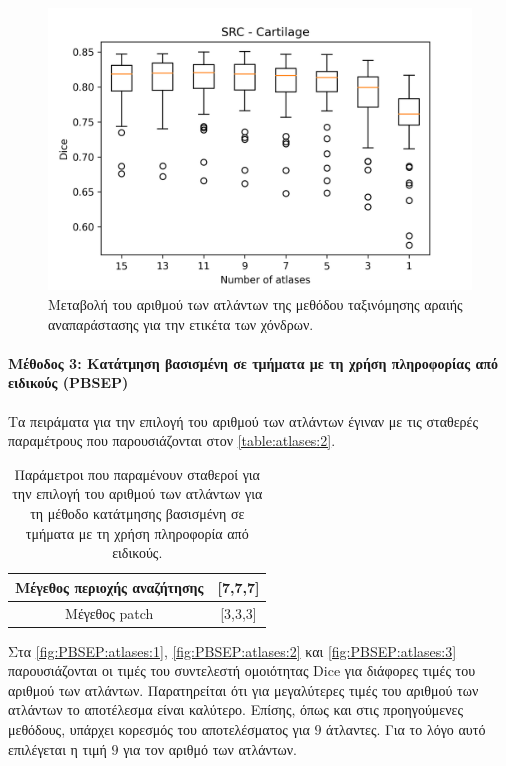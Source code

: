 \documentclass[a4paper,12pt]{article}
\newcommand{\paragraphLine}[1]{\paragraph{#1}\mbox{}}
\begin{document}
\begin{figure}[H]
    \centering
    \includegraphics[width=0.85\linewidth]{SRC_Number_of_atlases_Cartilage_plot.png}
    \caption{Μεταβολή του αριθμού των ατλάντων της μεθόδου ταξινόμησης αραιής
             αναπαράστασης για την ετικέτα των χόνδρων.}
    \label{fig:SRC:atlases:3}
\end{figure}

\paragraphLine{Μέθοδος 3: Κατάτμηση βασισμένη σε τμήματα με τη χρήση πληροφορίας
από ειδικούς (PBSEP)}

Τα πειράματα για την επιλογή του αριθμού των ατλάντων έγιναν με τις σταθερές
παραμέτρους που παρουσιάζονται στον \autoref{table:atlases:2}.

\begin{table}[h!]
    \centering
    \begin{tabular}{|c|c|} 
        \hline
        Μέγεθος περιοχής αναζήτησης & [7,7,7] \\ 
        \hline
        Μέγεθος patch & [3,3,3] \\ 
        \hline
    \end{tabular}
    \caption{Παράμετροι που παραμένουν σταθεροί για την επιλογή του αριθμού των
             ατλάντων για τη μέθοδο κατάτμησης βασισμένη σε τμήματα με τη χρήση
             πληροφορία από ειδικούς.}
    \label{table:atlases:2}
\end{table}

Στα \autoref{fig:PBSEP:atlases:1}, \autoref{fig:PBSEP:atlases:2} και
\autoref{fig:PBSEP:atlases:3} παρουσιάζονται οι τιμές του συντελεστή ομοιότητας
Dice για διάφορες τιμές του αριθμού των ατλάντων. Παρατηρείται ότι για
μεγαλύτερες τιμές του αριθμού των ατλάντων το αποτέλεσμα είναι καλύτερο. Επίσης,
όπως και στις προηγούμενες μεθόδους, υπάρχει κορεσμός του αποτελέσματος για $9$
άτλαντες. Για το λόγο αυτό επιλέγεται η τιμή $9$ για τον αριθμό των ατλάντων.
\end{document}
